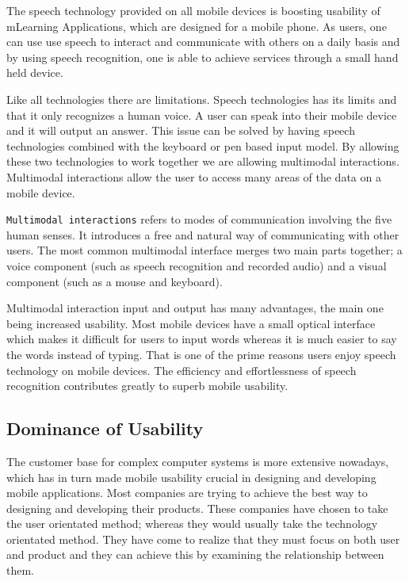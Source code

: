 \documentclass[runningheads,a4paper]{llncs}
\begin{document}
\begin{inparaenum}[]
The speech technology provided on all mobile devices is boosting usability of mLearning Applications, which are designed for a mobile phone. As users, one can use use speech to interact and communicate with others on a daily basis and by using speech recognition, one is able to achieve services through a small hand held device. 
\cite{kondratova2006m}
\end{inparaenum}

\begin{inparaenum}[]
Like all technologies there are limitations. Speech technologies has its limits and that it only recognizes a human voice. A user can speak into their mobile device and it will output an answer. This issue can be solved by having speech technologies combined with the keyboard or pen based input model. By allowing these two technologies to work together we are allowing multimodal interactions. Multimodal interactions allow the user to access many areas of the data on a mobile device.
\end{inparaenum}

\begin{inparaenum}[]
{\texttt{Multimodal interactions}} refers to modes of communication involving the five human senses. It introduces a free and natural way of communicating with other users. The most common multimodal interface merges two main parts together; a voice component (such as speech recognition and recorded audio) and a visual component (such as a mouse and keyboard). 
\end{inparaenum}

\begin{inparaenum}[]
Multimodal interaction input and output has many advantages, the main one being increased usability. Most mobile devices have a small optical interface which makes it difficult for users to input words whereas it is much easier to say the words instead of typing. That is one of the prime reasons users enjoy speech technology on mobile devices. The efficiency and effortlessness of speech recognition contributes greatly to superb mobile usability. 
\end{inparaenum}

\subsection{Dominance of Usability}
\label{sec:Dominance of Usability}
The customer base for complex computer systems is more extensive nowadays, which has in turn made mobile usability crucial in designing and developing mobile applications. Most companies are trying to achieve the best way to designing and developing their products. These companies have chosen to take the user orientated method; whereas they would usually take the technology orientated method. They have come to realize that they must focus on both user and product and they can achieve this by examining the relationship between them.
\cite {seraj2012study}
\end{document}
